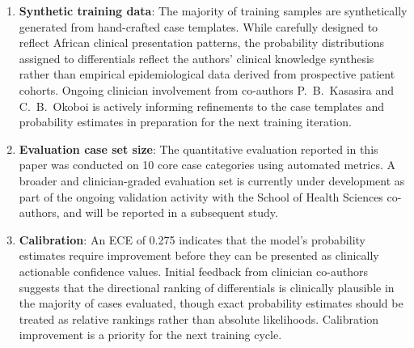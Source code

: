 \documentclass[journal]{IEEEtran}
\begin{document}
\begin{enumerate}
  \item \textbf{Synthetic training data}: The majority of training
        samples are synthetically generated from hand-crafted case
        templates. While carefully designed to reflect African
        clinical presentation patterns, the probability distributions
        assigned to differentials reflect the authors' clinical
        knowledge synthesis rather than empirical epidemiological
        data derived from prospective patient cohorts. Ongoing
        clinician involvement from co-authors P.~B.~Kasasira and
        C.~B.~Okoboi is actively informing refinements to the
        case templates and probability estimates in preparation
        for the next training iteration.

  \item \textbf{Evaluation case set size}: The quantitative
        evaluation reported in this paper was conducted on 10 core
        case categories using automated metrics. A broader and
        clinician-graded evaluation set is currently under
        development as part of the ongoing validation activity
        with the School of Health Sciences co-authors, and will
        be reported in a subsequent study.

  \item \textbf{Calibration}: An ECE of 0.275 indicates that the
        model's probability estimates require improvement before
        they can be presented as clinically actionable confidence
        values. Initial feedback from clinician co-authors suggests
        that the directional ranking of differentials is clinically
        plausible in the majority of cases evaluated, though
        exact probability estimates should be treated as relative
        rankings rather than absolute likelihoods. Calibration
        improvement is a priority for the next training cycle.


\end{enumerate}
\end{document}
